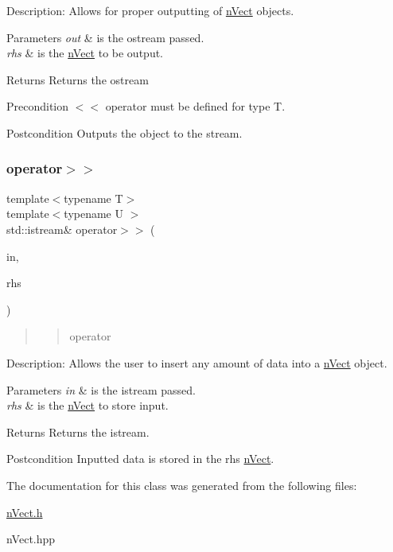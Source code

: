 Description\+: Allows for proper outputting of \hyperlink{classnVect}{n\+Vect} objects. 
\begin{DoxyParams}{Parameters}
{\em out} & is the ostream passed. \\
\hline
{\em rhs} & is the \hyperlink{classnVect}{n\+Vect} to be output. \\
\hline
\end{DoxyParams}
\begin{DoxyReturn}{Returns}
Returns the ostream 
\end{DoxyReturn}
\begin{DoxyPrecond}{Precondition}
$<$$<$ operator must be defined for type T. 
\end{DoxyPrecond}
\begin{DoxyPostcond}{Postcondition}
Outputs the object to the stream. 
\end{DoxyPostcond}
\mbox{\label{classnVect_ad614110b01ea7a7d8618a95d46186916}} 
\subsubsection{\texorpdfstring{operator$>$$>$}{operator>>}}
{\footnotesize\ttfamily template$<$typename T$>$ \\
template$<$typename U $>$ \\
std\+::istream\& operator$>$$>$ (\begin{DoxyParamCaption}\item[{std\+::istream \&}]{in,  }\item[{const \hyperlink{classnVect}{n\+Vect}$<$ U $>$ \&}]{rhs }\end{DoxyParamCaption})\hspace{0.3cm}{\ttfamily [friend]}}



\begin{quote}
\begin{quote}
operator\end{quote}
\end{quote}


Description\+: Allows the user to insert any amount of data into a \hyperlink{classnVect}{n\+Vect} object. 
\begin{DoxyParams}{Parameters}
{\em in} & is the istream passed. \\
\hline
{\em rhs} & is the \hyperlink{classnVect}{n\+Vect} to store input. \\
\hline
\end{DoxyParams}
\begin{DoxyReturn}{Returns}
Returns the istream. 
\end{DoxyReturn}
\begin{DoxyPostcond}{Postcondition}
Inputted data is stored in the rhs \hyperlink{classnVect}{n\+Vect}. 
\end{DoxyPostcond}


The documentation for this class was generated from the following files\+:\begin{DoxyCompactItemize}
\item 
\hyperlink{nVect_8h}{n\+Vect.\+h}\item 
n\+Vect.\+hpp\end{DoxyCompactItemize}
